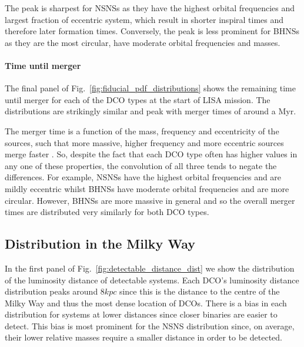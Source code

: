 The peak is sharpest for NSNSs as they have the highest orbital frequencies and largest fraction of eccentric system, which result in shorter inspiral times and therefore later formation times. Conversely, the peak is less prominent for BHNSs as they are the most circular, have moderate orbital frequencies and masses.

\paragraph{Time until merger} The final panel of Fig.~\ref{fig:fiducial_pdf_distributions} shows the remaining time until merger for each of the DCO types at the start of LISA mission. The distributions are strikingly similar and peak with merger times of around a Myr.

The merger time is a function of the mass, frequency and eccentricity of the sources, such that more massive, higher frequency and more eccentric sources merge faster \citep[][Eq.~5.14]{Peters+1964}. So, despite the fact that each DCO type often has higher values in any one of these properties, the convolution of all three tends to negate the differences. For example, NSNSs have the highest orbital frequencies and are mildly eccentric whilst BHNSs have moderate orbital frequencies and are more circular. However, BHNSs are more massive in general and so the overall merger times are distributed very similarly for both DCO types.

\subsection{Distribution in the Milky Way}\label{sec:mw_detectable_distribution}
In the first panel of Fig.~\ref{fig:detectable_distance_dist} we show the distribution of the luminosity distance of detectable systems. Each DCO's luminosity distance distribution peaks around $8 \unit{kpc}$ since this is the distance to the centre of the Milky Way and thus the most dense location of DCOs. There is a bias in each distribution for systems at lower distances since closer binaries are easier to detect. This bias is most prominent for the NSNS distribution since, on average, their lower relative masses require a smaller distance in order to be detected.

